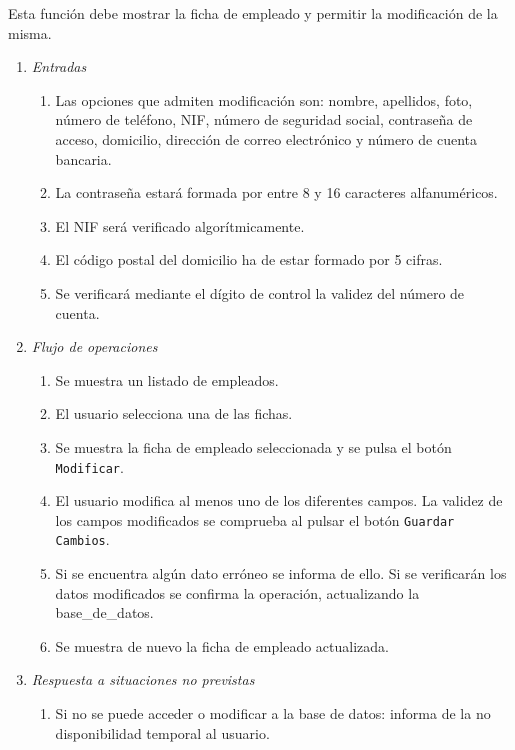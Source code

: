  \label{fun:editarempleado}
	Esta función debe mostrar la ficha de empleado y permitir la modificación de la misma.

\begin{enumerate}
	\item \textit{Entradas}
	\begin{enumerate}
		\item Las opciones que admiten modificación son: nombre, apellidos, foto, número de teléfono, NIF, número de seguridad social, contraseña de acceso, domicilio, dirección de correo electrónico y número de cuenta bancaria.
		\item La contraseña estará formada por entre 8 y 16 caracteres alfanuméricos.
		\item El \gls{NIF} será verificado algorítmicamente.
		\item El código postal del domicilio ha de estar formado por 5 cifras.
		\item Se verificará mediante el dígito de control la validez del número de cuenta.
	\end{enumerate}
	\item \textit{Flujo de operaciones}
	\begin{enumerate}
		\item Se muestra un listado de empleados.
		\item El usuario selecciona una de las fichas.
		\item Se muestra la ficha de empleado seleccionada y se pulsa el botón \verb|Modificar|.
		\item El usuario modifica al menos uno de los diferentes campos. La validez de los campos modificados se comprueba al pulsar el botón \verb|Guardar Cambios|.
		\item Si se encuentra algún dato erróneo se informa de ello. Si se verificarán los datos modificados se confirma la operación, actualizando la \gls{base_de_datos}.
		\item Se muestra de nuevo la ficha de empleado actualizada.
	\end{enumerate}
	\item \textit{Respuesta a situaciones no previstas}
	\begin{enumerate}
		\item Si no se puede acceder o modificar a la base de datos: informa de la no disponibilidad temporal al usuario.
	\end{enumerate}
\end{enumerate}
